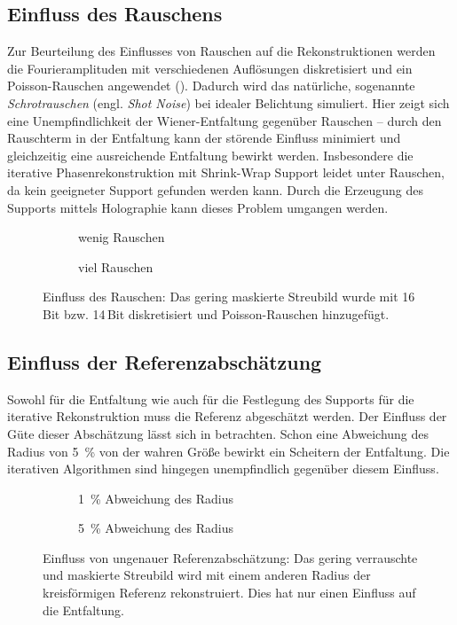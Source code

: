 \subsection{Einfluss des Rauschens}
Zur Beurteilung des Einflusses von Rauschen auf die Rekonstruktionen werden die Fourieramplituden mit verschiedenen Auflösungen diskretisiert und ein Poisson-Rauschen angewendet (). Dadurch wird das natürliche, sogenannte \textit{Schrotrauschen} (engl. \textit{Shot Noise}) bei idealer Belichtung simuliert. Hier zeigt sich eine Unempfindlichkeit der Wiener-Entfaltung gegenüber Rauschen -- durch den Rauschterm in der Entfaltung kann der störende Einfluss minimiert und gleichzeitig eine ausreichende Entfaltung bewirkt werden. Insbesondere die iterative Phasenrekonstruktion mit Shrink-Wrap Support leidet unter Rauschen, da kein geeigneter Support gefunden werden kann. Durch die Erzeugung des Supports mittels Holographie kann dieses Problem umgangen werden.
\begin{figure}
	\begin{subfigure}[b]{0.45\textwidth}
		\caption{wenig Rauschen}
	\end{subfigure}
	\hspace*{\fill}
	\begin{subfigure}[b]{0.45\textwidth}
		\caption{viel Rauschen}	
	\end{subfigure}
	\caption[2D Rekonstruktion: Rauschen]{Einfluss des Rauschen: Das gering maskierte Streubild wurde mit 16\,Bit bzw. 14\,Bit diskretisiert und Poisson-Rauschen hinzugefügt.}
	\label{fig:recon2d-noise}
\end{figure}
\subsection{Einfluss der Referenzabschätzung}
Sowohl für die Entfaltung wie auch für die Festlegung des Supports für die iterative Rekonstruktion muss die Referenz abgeschätzt werden. Der Einfluss der Güte dieser Abschätzung lässt sich in  betrachten. Schon eine Abweichung des Radius von 5~\% von der wahren Größe bewirkt ein Scheitern der Entfaltung. Die iterativen Algorithmen sind hingegen unempfindlich gegenüber diesem Einfluss.
\begin{figure}
	\begin{subfigure}[b]{0.45\textwidth}
		\caption{1~\% Abweichung des Radius}
	\end{subfigure}
	\hspace*{\fill}
	\begin{subfigure}[b]{0.45\textwidth}
		\caption{5~\% Abweichung des Radius}	
	\end{subfigure}
	\caption[2D Rekonstruktion: Referenz]{Einfluss von ungenauer Referenzabschätzung: Das gering verrauschte und maskierte Streubild wird mit einem anderen Radius der kreisförmigen Referenz rekonstruiert. Dies hat nur einen Einfluss auf die Entfaltung.}
	\label{fig:recon2d-ref}
\end{figure}

